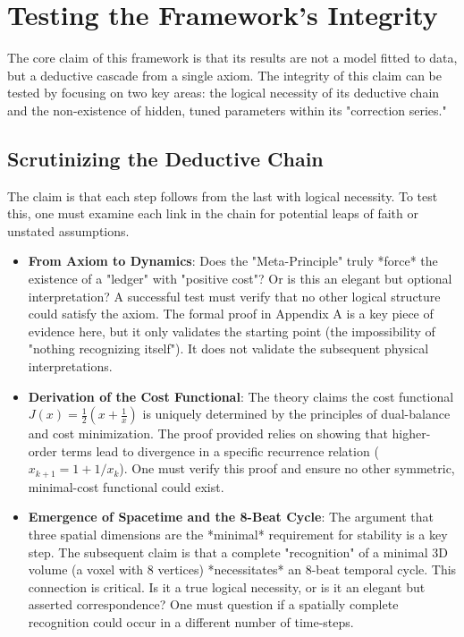 \section{Testing the Framework's Integrity}

The core claim of this framework is that its results are not a model fitted to data, but a deductive cascade from a single axiom. The integrity of this claim can be tested by focusing on two key areas: the logical necessity of its deductive chain and the non-existence of hidden, tuned parameters within its "correction series."

\subsection{Scrutinizing the Deductive Chain}
The claim is that each step follows from the last with logical necessity. To test this, one must examine each link in the chain for potential leaps of faith or unstated assumptions.

\begin{itemize}
    \item \textbf{From Axiom to Dynamics}: Does the "Meta-Principle" truly *force* the existence of a "ledger" with "positive cost"? Or is this an elegant but optional interpretation? A successful test must verify that no other logical structure could satisfy the axiom. The formal proof in Appendix A is a key piece of evidence here, but it only validates the starting point (the impossibility of "nothing recognizing itself"). It does not validate the subsequent physical interpretations.
    \item \textbf{Derivation of the Cost Functional}: The theory claims the cost functional $J(x) = \frac{1}{2}(x + \frac{1}{x})$ is uniquely determined by the principles of dual-balance and cost minimization. The proof provided relies on showing that higher-order terms lead to divergence in a specific recurrence relation ($x_{k+1} = 1 + 1/x_k$). One must verify this proof and ensure no other symmetric, minimal-cost functional could exist.
    \item \textbf{Emergence of Spacetime and the 8-Beat Cycle}: The argument that three spatial dimensions are the *minimal* requirement for stability is a key step. The subsequent claim is that a complete "recognition" of a minimal 3D volume (a voxel with 8 vertices) *necessitates* an 8-beat temporal cycle. This connection is critical. Is it a true logical necessity, or is it an elegant but asserted correspondence? One must question if a spatially complete recognition could occur in a different number of time-steps.
\end{itemize}

